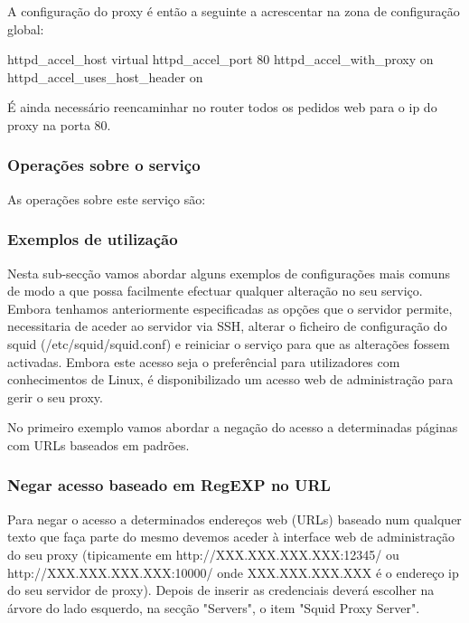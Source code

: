 A configuração do proxy é então a seguinte a acrescentar na
zona de configuração global:

\begin{Output}
httpd_accel_host virtual
httpd_accel_port 80
httpd_accel_with_proxy on
httpd_accel_uses_host_header on
\end{Output}

É ainda necessário reencaminhar no router todos os pedidos web para
o ip do proxy na porta 80.

\subsubsection{Operações sobre o serviço}

As operações sobre este serviço são:


\subsubsection{Exemplos de utilização}

Nesta sub-secção vamos abordar alguns exemplos de configurações mais comuns de modo a que possa facilmente efectuar qualquer alteração no seu serviço.
Embora tenhamos anteriormente especificadas as opções que o servidor permite, necessitaria de aceder ao servidor via SSH, alterar o ficheiro de configuração do squid (/etc/squid/squid.conf) e reiniciar o serviço para que as alterações fossem activadas. Embora este acesso seja o preferêncial para utilizadores com conhecimentos de Linux, é disponibilizado um acesso web de administração para gerir o seu proxy.

No primeiro exemplo vamos abordar a negação do acesso a determinadas páginas com URLs baseados em padrões.

\subsubsection{Negar acesso baseado em RegEXP no URL}

Para negar o acesso a determinados endereços web (URLs) baseado num qualquer texto que faça parte do mesmo devemos aceder à interface web de administração do seu proxy (tipicamente em http://XXX.XXX.XXX.XXX:12345/ ou http://XXX.XXX.XXX.XXX:10000/ onde XXX.XXX.XXX.XXX é o endereço ip do seu servidor de proxy). Depois de inserir as credenciais deverá escolher na árvore do lado esquerdo, na secção "Servers", o item "Squid Proxy Server".

